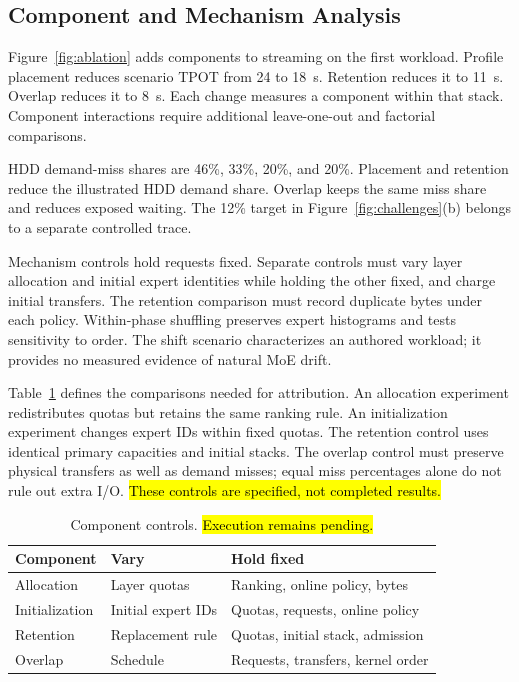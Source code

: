 \documentclass[conference,9pt,letterpaper]{IEEEtran}
\newcommand{\draftnote}[1]{{\sethlcolor{DraftYellow}\hl{#1}}}
\newcommand{\draftvalue}[1]{{\setlength{\fboxsep}{0.4pt}\colorbox{DraftYellow}{#1}}}
\begin{document}
\subsection{Component and Mechanism Analysis}
\label{sec:mechanisms}
Figure~\ref{fig:ablation} adds components to streaming on the first workload. Profile placement reduces scenario TPOT from \draftvalue{24} to \draftvalue{18}~s. Retention reduces it to \draftvalue{11}~s. Overlap reduces it to \draftvalue{8}~s. Each change measures a component within that stack. Component interactions require additional leave-one-out and factorial comparisons.

HDD demand-miss shares are \draftvalue{46}\%, \draftvalue{33}\%, \draftvalue{20}\%, and \draftvalue{20}\%. Placement and retention reduce the illustrated HDD demand share. Overlap keeps the same miss share and reduces exposed waiting. The \draftvalue{12}\% target in Figure~\ref{fig:challenges}(b) belongs to a separate controlled trace.

Mechanism controls hold requests fixed. Separate controls must vary layer allocation and initial expert identities while holding the other fixed, and charge initial transfers. The retention comparison must record duplicate bytes under each policy. Within-phase shuffling preserves expert histograms and tests sensitivity to order. The shift scenario characterizes an authored workload; it provides no measured evidence of natural MoE drift.

Table~\ref{tab:controls} defines the comparisons needed for attribution. An allocation experiment redistributes quotas but retains the same ranking rule. An initialization experiment changes expert IDs within fixed quotas. The retention control uses identical primary capacities and initial stacks. The overlap control must preserve physical transfers as well as demand misses; equal miss percentages alone do not rule out extra I/O. \draftnote{These controls are specified, not completed results.}

\begin{table}[t]
\caption{Component controls. \draftnote{Execution remains pending.}}
\label{tab:controls}\centering
\begin{tabular}{@{}p{}p{}p{}@{}}\toprule
Component & Vary & Hold fixed\\\midrule
Allocation & Layer quotas & Ranking, online policy, bytes\\
Initialization & Initial expert IDs & Quotas, requests, online policy\\
Retention & Replacement rule & Quotas, initial stack, admission\\
Overlap & Schedule & Requests, transfers, kernel order\\\bottomrule
\end{tabular}
\end{table}
\end{document}
